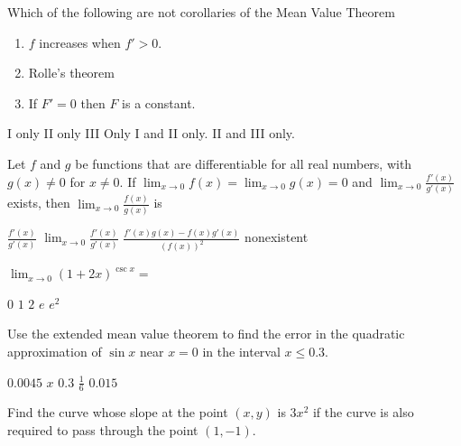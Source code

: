 \begin{questions}
\question[2] Which of the following are not corollaries of the Mean
    Value Theorem
    
    \begin{enumerate}
    \item $f$ increases when $f' > 0$.
    \item Rolle's theorem
    \item If $F' = 0$ then $F$ is a constant.
    \end{enumerate}

    \begin{oneparchoices}
    \choice I only
    \CorrectChoice II only
    \choice III Only
    \choice I and II only.
    \choice II and III only.    
    \end{oneparchoices}

\question[2] Let $f$ and $g$ be functions that are differentiable for
    all real numbers, with $g(x) \ne 0$ for $x \ne 0$. If $\lim_{x \to
    0} f(x) = \lim_{x \to 0} g(x) = 0$ and $\lim_{x \to
    0} \frac{f'(x)}{g'(x)}$ exists, then $\lim_{x \to
    0} \frac{f(x)}{g(x)}$ is 

    \begin{oneparchoices}
    \choice $\frac{f'(x)}{g'(x)}$
    \CorrectChoice $\lim_{x \to 0} \frac{f'(x)}{g'(x)}$
    \choice $\frac{f'(x)g(x) - f(x)g'(x)}{(f(x))^2}$
    \choice nonexistent
    \end{oneparchoices}

\question[2] $\lim_{x \to 0} (1 + 2x)^{\csc x} = $

    \begin{oneparchoices}
    \choice $0$
    \choice $1$
    \choice $2$
    \choice $e$
    \CorrectChoice $e^2$
    \end{oneparchoices}

\question[2] Use the extended mean value theorem to find the error in
    the quadratic approximation of $\sin x$ near $x = 0$ in the
    interval $x \le 0.3$.

    \begin{oneparchoices}
    \CorrectChoice $0.0045$
    \choice $x$
    \choice $0.3$
    \choice $\frac{1}{6}$
    \choice $0.015$
    \end{oneparchoices}

\question[2] Find the curve whose slope at the point $(x, y)$ is
    $3x^2$ if the curve is also required to pass through the point
    $(1, -1)$.


\end{questions}
